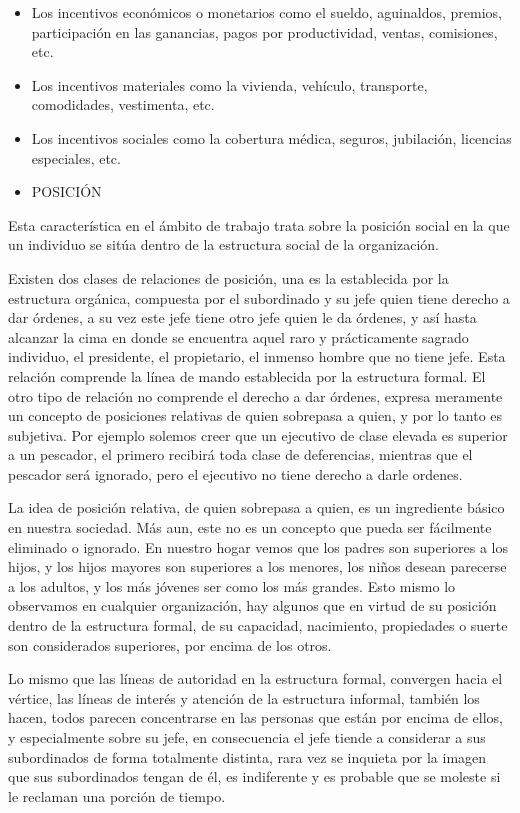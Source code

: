 \begin{itemize}
  \item Los incentivos económicos o monetarios como el sueldo, aguinaldos, premios, participación en las ganancias, pagos por productividad, ventas, comisiones, etc.
  \item Los incentivos materiales como la vivienda, vehículo, transporte, comodidades, vestimenta, etc.
  \item Los incentivos sociales como la cobertura médica, seguros, jubilación, licencias especiales, etc.
  \item POSICIÓN
\end{itemize}
Esta característica en el ámbito de trabajo trata sobre la posición social en la que un individuo se sitúa dentro de la estructura social de la organización.

Existen dos clases de relaciones de posición, una es la establecida por la estructura orgánica, compuesta por el subordinado y su jefe quien tiene derecho a dar órdenes, a su vez este jefe tiene otro jefe quien le da órdenes, y así hasta alcanzar la cima en donde se encuentra aquel raro y prácticamente sagrado individuo, el presidente, el propietario, el inmenso hombre que no tiene jefe. Esta relación comprende la línea de mando establecida por la estructura formal. El otro tipo de relación no comprende el derecho a dar órdenes, expresa meramente un concepto de posiciones relativas de quien sobrepasa a quien, y por lo tanto es subjetiva. Por ejemplo solemos creer que un ejecutivo de clase elevada es superior a un pescador, el primero recibirá toda clase de deferencias, mientras que el pescador será ignorado, pero el ejecutivo no tiene derecho a darle ordenes.

La idea de posición relativa, de quien sobrepasa a quien, es un ingrediente básico en nuestra sociedad. Más aun, este no es un concepto que pueda ser fácilmente eliminado o ignorado. En nuestro hogar vemos que los padres son superiores a los hijos, y los hijos mayores son superiores a los menores, los niños desean parecerse a los adultos, y los más jóvenes ser como los más grandes. Esto mismo lo observamos en cualquier organización, hay algunos que en virtud de su posición dentro de la estructura formal, de su capacidad, nacimiento, propiedades o suerte son considerados superiores, por encima de los otros.

Lo mismo que las líneas de autoridad en la estructura formal, convergen hacia el vértice, las líneas de interés y atención de la estructura informal, también los hacen, todos parecen concentrarse en las personas que están por encima de ellos, y especialmente sobre su jefe, en consecuencia el jefe tiende a considerar a sus subordinados de forma totalmente distinta, rara vez se inquieta por la imagen que sus subordinados tengan de él, es indiferente y es probable que se moleste si le reclaman una porción de tiempo.

